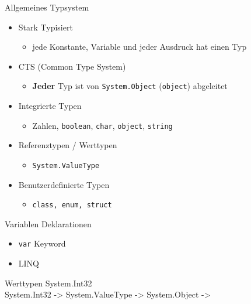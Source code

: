 \documentclass[11pt]{beamer}
\begin{document}
\begin{frame}{Allgemeines Typsystem}
\begin{itemize}
	\item Stark Typisiert
	\begin{itemize}
		\item jede Konstante, Variable und jeder Ausdruck hat einen Typ
	\end{itemize}
	\item CTS (Common Type System)
	\begin{itemize}
		\item \textbf{Jeder} Typ ist von \texttt{System.Object} (\texttt{object}) abgeleitet
	\end{itemize}

	\item Integrierte Typen
	\begin{itemize}
		\item \glqq Zahlen\grqq{}, \texttt{boolean}, \texttt{char}, \texttt{object}, \texttt{string}
	\end{itemize}
	\item Referenztypen / Werttypen
	\begin{itemize}
		\item \texttt{System.ValueType}
	\end{itemize}
	\item Benutzerdefinierte Typen
	\begin{itemize}
		\item \texttt{class, enum, struct}
	\end{itemize}
\end{itemize}
\end{frame}


\begin{frame}{Variablen Deklarationen}

%
\begin{itemize}
	\item \texttt{var} Keyword \cite{so_var_java}
	\item LINQ
\end{itemize}
\end{frame}


\begin{frame}{Werttypen}
System.Int32 \\ %
System.Int32 -> System.ValueType -> System.Object ->
\end{frame}
\end{document}
